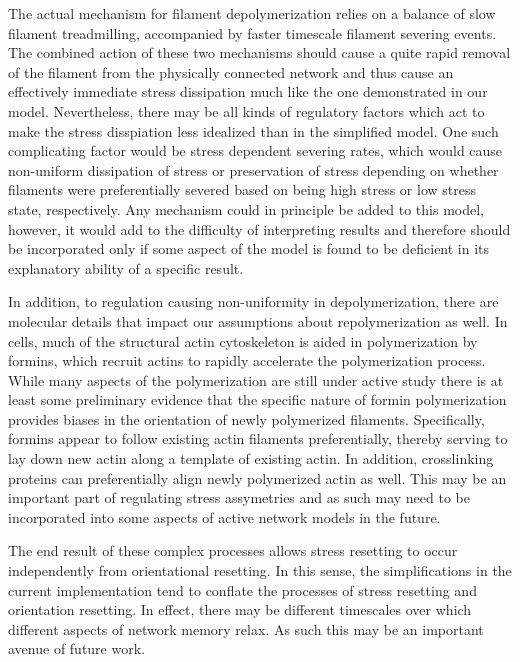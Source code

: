 The actual mechanism for filament depolymerization relies on a balance of slow filament treadmilling, accompanied by faster timescale filament severing events.  The combined action of these two mechanisms should cause a quite rapid removal of the filament from the physically connected network and thus cause an effectively immediate stress dissipation much like the one demonstrated in our model. Nevertheless, there may be all kinds of regulatory factors which act to make the stress disspiation less idealized than in the simplified model.  One such complicating factor would be stress dependent severing rates, which would cause non-uniform dissipation of stress or preservation of stress depending on whether filaments were preferentially severed based on being high stress or low stress state, respectively.  Any mechanism could in principle be added to this model, however, it would add to the difficulty of interpreting results and therefore should be incorporated only if some aspect of the model is found to be deficient in its explanatory ability of a specific result.

In addition, to regulation causing non-uniformity in depolymerization, there are molecular details that impact our assumptions about repolymerization as well. In cells, much of the structural actin cytoskeleton is aided in polymerization by formins, which recruit actins to rapidly accelerate the polymerization process.  While many aspects of the polymerization are still under active study there is at least some preliminary evidence that the specific nature of formin polymerization provides biases in the orientation of newly polymerized filaments.  Specifically, formins appear to follow existing actin filaments preferentially, thereby serving to lay down new actin along a template of existing actin.  In addition, crosslinking proteins can preferentially align newly polymerized actin as well.  This may be an important part of regulating stress assymetries and as such may need to be incorporated into some aspects of active network models in the future.  

The end result of these complex processes allows stress resetting to occur independently from orientational resetting.  In this sense, the simplifications in the current implementation tend to conflate the processes of stress resetting and orientation resetting. In effect, there may be different timescales over which different aspects of network memory relax.  As such this may be an important avenue of future work.


